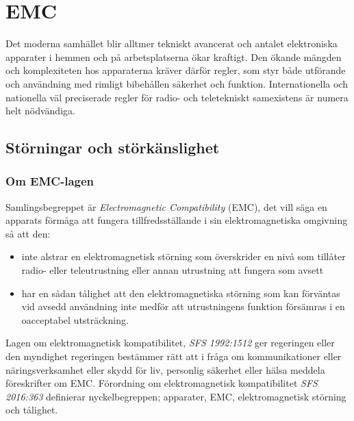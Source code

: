\chapter{EMC}
\label{EMC}

\noindent Det moderna samhället blir alltmer tekniskt avancerat och antalet elektroniska
apparater i hemmen och på arbetsplatserna ökar kraftigt.
Den ökande mängden och komplexiteten hos apparaterna kräver därför regler, som
styr både utförande och användning med rimligt bibehållen säkerhet och funktion.
Internationella och nationella väl preciserade regler för radio- och
teletekniskt samexistens är numera helt nödvändiga.

\section{Störningar och störkänslighet}

\subsection{Om EMC-lagen}
\label{EMC-lagen}

Samlingsbegreppet är \emph{Electromagnetic Compatibility} (EMC), det vill säga
en apparats förmåga att fungera tillfredsställande i sin elektromagnetiska
omgivning så att den:

\begin{itemize}
\item inte alstrar en elektromagnetisk störning som överskrider en nivå som
  tillåter radio- eller teleutrustning eller annan utrustning att fungera som
  avsett

\item har en sådan tålighet att den elektromagnetiska störning som kan
  förväntas vid avsedd användning inte medför att utrustningens funktion
  försämras i en oacceptabel utsträckning.
\end{itemize}

Lagen om elektromagnetisk kompatibilitet, \emph{SFS 1992:1512} \cite{SFS1992:1512}
ger regeringen eller den myndighet regeringen bestämmer rätt att i fråga om
kommunikationer eller näringsverksamhet eller skydd för liv, personlig säkerhet
eller hälsa meddela föreskrifter om EMC.
Förordning om elektromagnetisk kompatibilitet \emph{SFS 2016:363}
\cite{SFS2016:363} definierar nyckelbegreppen; apparater, EMC, elektromagnetisk
störning och tålighet.

